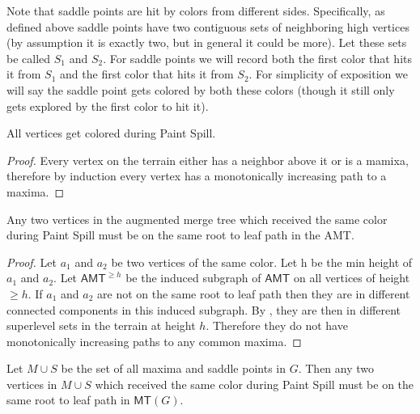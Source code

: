 \documentclass[A4paper,11pt]{article}
\newcommand{\AMT}{\ensuremath{\mathsf{AMT}}\xspace}
\newcommand{\MT}{\ensuremath{\mathsf{MT}}\xspace}
\begin{document}
Note that saddle points are hit by colors from different sides.  Specifically, as defined above saddle points have two contiguous sets of neighboring high vertices (by assumption it is exactly two, but in general it could be more).  Let these sets be called $S_1$ and $S_2$.  
For saddle points we will record both the first color that hits it from $S_1$ and the first color that hits it from $S_2$.  For simplicity of exposition we will say the saddle point gets colored by both these colors (though it still only gets explored by the first color to hit it).

\begin{lemma}
All vertices get colored during Paint Spill.
\end{lemma}
\begin{proof}
Every vertex on the terrain either has a neighbor above it or is a mamixa, therefore by induction every vertex has a monotonically increasing path to a maxima.
\end{proof}
\begin{lemma}
Any two vertices in the augmented merge tree which received the same color during Paint Spill must be on the same root to leaf path in the AMT. 
\end{lemma}
\begin{proof}Let $a_1$ and $a_2$ be two vertices of the same color.  Let h be the min height of $a_1$ and $a_2$.  Let $\AMT^{\geq h}$ be the induced subgraph of \AMT on all vertices of height $\geq h$.  If $a_1$ and $a_2$ are not on the same root to leaf path then they are in different connected components in this induced subgraph.  By , they are then in different superlevel sets in the terrain at height $h$.  Therefore they do not have monotonically increasing paths to any common maxima.
\end{proof}
\begin{corollary}
Let $M\cup S$ be the set of all maxima and saddle points in $G$.  Then any two vertices in $M\cup S$ which received the same color during Paint Spill must be on the same root to leaf path in $\MT(G)$. 
\end{corollary}
\end{document}
